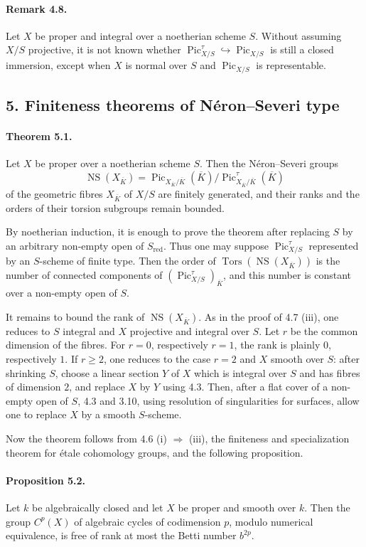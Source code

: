 \documentclass[11pt]{article}
\theoremstyle{plain}
\theoremstyle{definition}
\theoremstyle{remark}
\DeclareMathOperator{\Pic}{Pic}
\newcommand{\ov}[1]{\overline{#1}}
\providecommand{\red}{\mathrm{red}}
\providecommand{\NS}{\operatorname{NS}}
\providecommand{\Tors}{\operatorname{Tors}}
\begin{document}
\paragraph{Remark 4.8.}
Let $X$ be proper and integral over a noetherian scheme $S$. Without assuming $X/S$ projective, it is not known whether $\Pic^\tau_{X/S}\hookrightarrow \Pic_{X/S}$ is still a closed immersion, except when $X$ is normal over $S$ and $\Pic_{X/S}$ is representable.

\subsection*{5. Finiteness theorems of Néron--Severi type}

\paragraph{Theorem 5.1.}
Let $X$ be proper over a noetherian scheme $S$. Then the Néron--Severi groups
\[
\NS(X_{\ov K})=
\Pic_{X_{\ov K}/\ov K}(\ov K)/\Pic^\tau_{X_{\ov K}/\ov K}(\ov K)
\]
of the geometric fibres $X_{\ov K}$ of $X/S$ are finitely generated, and their ranks and the orders of their torsion subgroups remain bounded.

By noetherian induction, it is enough to prove the theorem after replacing $S$ by an arbitrary non-empty open of $S_{\red}$. Thus one may suppose $\Pic^\tau_{X/S}$ represented by an $S$-scheme of finite type. Then the order of $\Tors(\NS(X_{\ov K}))$ is the number of connected components of $(\Pic^\tau_{X/S})_{\ov K}$, and this number is constant over a non-empty open of $S$.

It remains to bound the rank of $\NS(X_{\ov K})$. As in the proof of 4.7 (iii), one reduces to $S$ integral and $X$ projective and integral over $S$. Let $r$ be the common dimension of the fibres. For $r=0$, respectively $r=1$, the rank is plainly $0$, respectively $1$. If $r\geq 2$, one reduces to the case $r=2$ and $X$ smooth over $S$: after shrinking $S$, choose a linear section $Y$ of $X$ which is integral over $S$ and has fibres of dimension $2$, and replace $X$ by $Y$ using 4.3. Then, after a flat cover of a non-empty open of $S$, 4.3 and 3.10, using resolution of singularities for surfaces, allow one to replace $X$ by a smooth $S$-scheme.

Now the theorem follows from 4.6 (i) $\Rightarrow$ (iii), the finiteness and specialization theorem for étale cohomology groups, and the following proposition.

\paragraph{Proposition 5.2.}
Let $k$ be algebraically closed and let $X$ be proper and smooth over $k$. Then the group $C^p(X)$ of algebraic cycles of codimension $p$, modulo numerical equivalence, is free of rank at most the Betti number $b^{2p}$.
\end{document}
